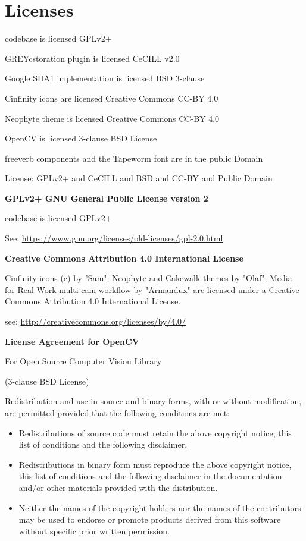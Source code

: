 \chapter{Licenses}%
\label{cha:licenses}

\CGG{} codebase is licensed GPLv2+

GREYcstoration plugin is licensed CeCILL v2.0

Google SHA1 implementation is licensed BSD 3-clause

Cinfinity icons are licensed Creative Commons CC-BY 4.0

Neophyte theme is licensed Creative Commons CC-BY 4.0

OpenCV is licensed 3-clause BSD License

freeverb components and the Tapeworm font are in the public Domain

License: GPLv2+ and CeCILL and BSD and CC-BY and Public Domain

\vspace{2ex} \textbf{GPLv2+ \qquad   GNU General Public License version 2}

\CGG{} codebase is licensed GPLv2+ 

See: {\small \url{https://www.gnu.org/licenses/old-licenses/gpl-2.0.html}}

\vspace{2ex} \textbf{Creative Commons Attribution 4.0 International License}

Cinfinity icons (c) by "Sam"; Neophyte and Cakewalk themes by "Olaf"; Media for Real Work multi-cam workflow by "Armandux" are licensed under a
Creative Commons Attribution 4.0 International License.

see: {\small \url{http://creativecommons.org/licenses/by/4.0/}}

\vspace{2ex} \textbf{License Agreement for OpenCV}

\begin{center}
For Open Source Computer Vision Library

(3-clause BSD License)
\end{center}

Redistribution and use in source and binary forms, with or without modification, are permitted provided that the following conditions are met:

\begin{itemize}
	\item Redistributions of source code must retain the above copyright notice, this list of conditions and the following disclaimer.
	\item Redistributions in binary form must reproduce the above copyright notice, this list of conditions and the following disclaimer in the documentation and/or other materials provided with the distribution.
	\item Neither the names of the copyright holders nor the names of the contributors may be used to endorse or promote products derived from this software without specific prior written permission.
\end{itemize}

